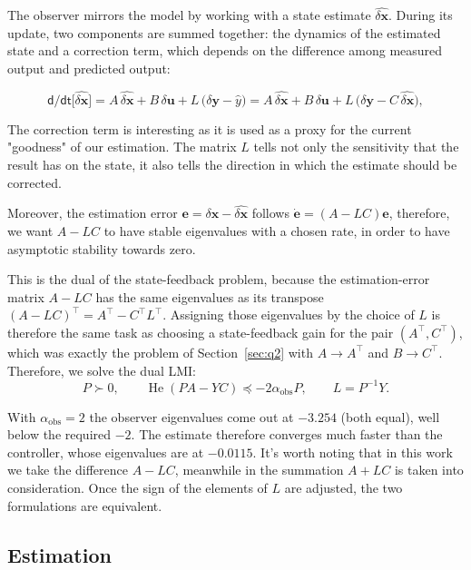 \documentclass[10pt,a4paper]{scrartcl}
\begin{document}
The observer mirrors the model by working with a state estimate $\widehat{\delta \bm x}$. During its update, two components are summed together: the dynamics of the estimated state and a correction term, which depends on the difference among measured output and predicted output: 

\begin{equation}
    \mathsf{d/dt}\Big[\widehat{\delta\bm{x}}\Big]
    = A\,\widehat{\delta\bm{x}} + B\,\delta\bm{u}
      + L\,\big(\delta\bm{y}- \widehat y\big)
    = A\,\widehat{\delta\bm{x}} + B\,\delta\bm{u}
      + L\,\big(\delta\bm{y}-C\,\widehat{\delta\bm{x}}\big),
    \label{eq:q3_obs}
\end{equation}

The correction term is interesting as it is used as a proxy for the current "goodness" of our estimation. The matrix $L$ tells not only the sensitivity that the result has on the state, it also tells the direction in which the estimate should be corrected. 

Moreover, the estimation error $\bm{e}=\delta\bm{x}-\widehat{\delta\bm{x}}$ follows $\dot{\bm{e}}=(A-LC)\bm{e}$, therefore, we want $A-LC$ to have stable eigenvalues with a chosen rate, in order to have asymptotic stability towards zero. 

This is the dual of the state-feedback problem, because the estimation-error matrix $A-LC$ has the same eigenvalues as its transpose $(A-LC)^\top = A^\top - C^\top L^\top$. Assigning those eigenvalues by the choice of $L$ is therefore the same task as choosing a state-feedback gain for the pair $(A^\top,C^\top)$, which was exactly the problem of Section~\ref{sec:q2} with $A\to A^\top$ and $B\to C^\top$. Therefore, we solve the dual LMI:
\begin{equation}
    P\succ0,\qquad \operatorname{He}(PA-YC)\preceq-2\alpha_{\mathrm{obs}}P,
    \qquad L=P^{-1}Y .
    \label{eq:q3_lmi}
\end{equation}

With $\alpha_{\mathrm{obs}}=2$ the observer eigenvalues come out at $-3.254$ (both equal), well below the required $-2$. The estimate therefore converges much faster than the controller, whose eigenvalues are at $-0.0115$. It's worth noting that in this work we take the difference $A-LC$, meanwhile in \cite{zaccarian_lmi} the summation $A+LC$ is taken into consideration. Once the sign of the elements of $L$ are adjusted, the two formulations are equivalent.

\subsection{Estimation}
\end{document}
